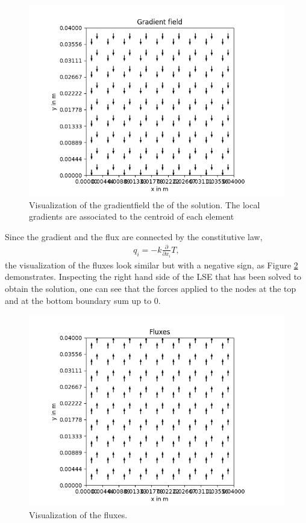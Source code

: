 \documentclass[a4paper,pt]{report}
\begin{document}
\begin{figure}
	\centering
	\includegraphics[scale=0.6]{gradientfield.png}
	\caption{Visualization of the gradientfield the of the solution. The local gradients are associated to the centroid of each element}
	\label{gradientfield}
\end{figure}

Since the gradient and the flux are connected by the constitutive law,
\begin{align*}
q_i=-k\frac{\partial }{\partial x_i}T,
\end{align*}
the visualization of the fluxes look similar but with a negative sign, as Figure \ref{fluxes} demonstrates. Inspecting the right hand side of the LSE that has been solved to obtain the solution, one can see that the forces applied to the nodes at the top and at the bottom boundary sum up to 0. 

\begin{figure}
	\centering
	\includegraphics[scale=0.6]{fluxes.png}
	\caption{Visualization of the fluxes.}
	\label{fluxes}
\end{figure}
\end{document}
